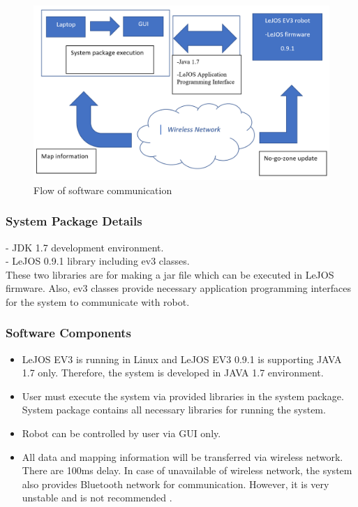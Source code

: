 \documentclass[10pt,a4paper,titlepage]{article}
\begin{document}
	\begin{figure}[h]
		\includegraphics[width=\linewidth]{software_interface.PNG}
		\caption{Flow of software communication}
		\label{fig:Flow of software communication}
	\end{figure}
	
	\subsubsection*{System Package Details}
	- JDK 1.7 development environment.\\
	- LeJOS 0.9.1 library including ev3 classes.\\
	
	These two libraries are for making a jar file which can be executed in LeJOS firmware. Also, ev3 classes provide necessary application programming interfaces for the system to communicate with robot.
	
	\subsubsection*{Software Components}
	\begin{itemize}
		\item LeJOS EV3 is running in Linux and LeJOS EV3 0.9.1 is supporting JAVA 1.7 only.     
		Therefore, the system is developed in JAVA 1.7 environment.
		\item User must execute the system via provided libraries in the system package. System package contains all necessary libraries for running the system.
		\item Robot can be controlled by user via GUI only.
		\item All data and mapping information will be transferred via wireless network. There are 100ms delay. In case of unavailable of wireless network, the system also provides Bluetooth network for communication. However, it is very unstable and is not recommended .
	\end{itemize} 
	
\end{document}
